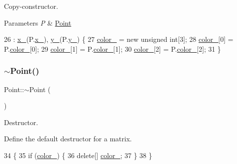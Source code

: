 Copy-\/constructor. 


\begin{DoxyParams}{Parameters}
{\em P} & \mbox{\hyperlink{class_point}{Point}} \\
\hline
\end{DoxyParams}

\begin{DoxyCode}
26                            : \mbox{\hyperlink{class_point_acfe156c55546f7e551fb54c7ea08a6cb}{x\_}}(P.\mbox{\hyperlink{class_point_acfe156c55546f7e551fb54c7ea08a6cb}{x\_}}), \mbox{\hyperlink{class_point_ae45effa2adb0036e4a770abb9b1160e6}{y\_}}(P.\mbox{\hyperlink{class_point_ae45effa2adb0036e4a770abb9b1160e6}{y\_}}) \{
27     \mbox{\hyperlink{class_point_af3333647d73989850d2fbf64d14eb9cb}{color\_}} = \textcolor{keyword}{new} \textcolor{keywordtype}{unsigned} \textcolor{keywordtype}{int}[3];
28     \mbox{\hyperlink{class_point_af3333647d73989850d2fbf64d14eb9cb}{color\_}}[0] = P.\mbox{\hyperlink{class_point_af3333647d73989850d2fbf64d14eb9cb}{color\_}}[0];
29     \mbox{\hyperlink{class_point_af3333647d73989850d2fbf64d14eb9cb}{color\_}}[1] = P.\mbox{\hyperlink{class_point_af3333647d73989850d2fbf64d14eb9cb}{color\_}}[1];
30     \mbox{\hyperlink{class_point_af3333647d73989850d2fbf64d14eb9cb}{color\_}}[2] = P.\mbox{\hyperlink{class_point_af3333647d73989850d2fbf64d14eb9cb}{color\_}}[2];
31 \}
\end{DoxyCode}
\mbox{\label{class_point_a395fa04b4ec126b66fc053f829a30cc1}} 
\subsubsection{\texorpdfstring{$\sim$\+Point()}{~Point()}}
{\footnotesize\ttfamily Point\+::$\sim$\+Point (\begin{DoxyParamCaption}{ }\end{DoxyParamCaption})}



Destructor. 

Define the default destructor for a matrix. 
\begin{DoxyCode}
34               \{
35     \textcolor{keywordflow}{if} (\mbox{\hyperlink{class_point_af3333647d73989850d2fbf64d14eb9cb}{color\_}}) \{
36         \textcolor{keyword}{delete}[] \mbox{\hyperlink{class_point_af3333647d73989850d2fbf64d14eb9cb}{color\_}};
37     \}
38 \}
\end{DoxyCode}


